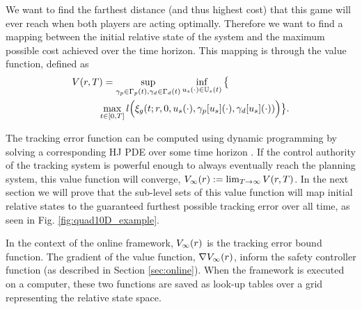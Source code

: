 

We want to find the farthest distance (and thus highest cost) that this game will ever reach when both players are acting optimally. Therefore we want to find a mapping between the initial relative state of the system and the maximum possible cost achieved over the time horizon. This mapping is through the value function, defined as
 \begin{align}
 \label{eq:valfunc}
 	V(r,&\,T)= \sup_{\gamma_{p} \in \Gamma_p(t), \gamma_{d} \in \Gamma_d(t)} \inf_{u_s(\cdot) \in \mathbb{U}_s(t)} \big\{\notag\\
 &\;\;\;\max_{t\in [0, T]} l\Big(\xi_g(t; r, 0, u_s(\cdot), \gamma_p[u_s](\cdot), \gamma_d[u_s](\cdot))\Big)\big\}.
 	\end{align}

The tracking error function can be computed using dynamic programming by solving a corresponding HJ PDE over some time horizon \cite{Mitchell05, Fisac15}. If the control authority of the tracking system is powerful enough to always eventually reach the planning system, this value function will converge, $V_\infty(r) := \lim_{T\rightarrow\infty} V(r, T)$. In the next section we will prove that the sub-level sets of this value function will map initial relative states to the guaranteed furthest possible tracking error over all time, as seen in Fig. \ref{fig:quad10D_example}.
 
In the context of the online framework, $V_\infty(r)$ is the tracking error bound function. The gradient of the value function, $\nabla V_\infty(r)$, inform the safety controller function (as described in Section \ref{sec:online}). When the framework is executed on a computer, these two functions are saved as look-up tables over a grid representing the relative state space.
 
